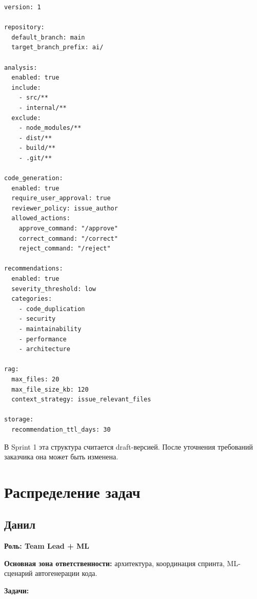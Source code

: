 \documentclass[12pt,a4paper]{article}
\begin{document}
\begin{verbatim}
version: 1

repository:
  default_branch: main
  target_branch_prefix: ai/

analysis:
  enabled: true
  include:
    - src/**
    - internal/**
  exclude:
    - node_modules/**
    - dist/**
    - build/**
    - .git/**

code_generation:
  enabled: true
  require_user_approval: true
  reviewer_policy: issue_author
  allowed_actions:
    approve_command: "/approve"
    correct_command: "/correct"
    reject_command: "/reject"

recommendations:
  enabled: true
  severity_threshold: low
  categories:
    - code_duplication
    - security
    - maintainability
    - performance
    - architecture

rag:
  max_files: 20
  max_file_size_kb: 120
  context_strategy: issue_relevant_files

storage:
  recommendation_ttl_days: 30
\end{verbatim}

В Sprint 1 эта структура считается draft-версией. После уточнения требований заказчика она может быть изменена.

\section{Распределение задач}

\subsection{Данил}

\textbf{Роль: Team Lead + ML}

\textbf{Основная зона ответственности:} архитектура, координация спринта, ML-сценарий автогенерации кода.

\textbf{Задачи:}
\end{document}
